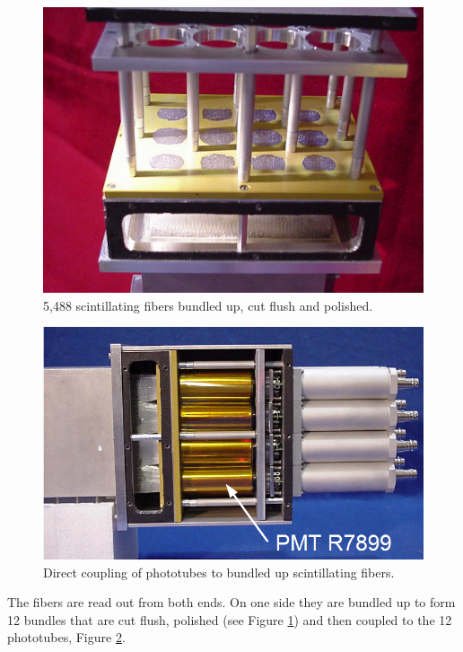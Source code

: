 \begin{figure}[h]
\centering
\includegraphics[width=0.9\linewidth]{images/Fig6a_FiberBundle.jpg} 
    \caption{5,488 scintillating fibers bundled up, cut flush and polished.} 
    \label{fig:FiberBundle}
\end{figure}

\begin{figure}[h]
\centering
\includegraphics[width=0.9\linewidth]{images/Fig6b_DirectCouplePhototube_Text.png} 
    \caption{Direct coupling of phototubes to bundled up scintillating fibers.} 
    \label{fig:DirectCouplePhototube}
\end{figure}

The fibers are read out from both ends. On one side they are bundled up to form 12 bundles that are cut flush, polished (see Figure \ref{fig:FiberBundle}) and then coupled to the 12 phototubes, Figure \ref{fig:DirectCouplePhototube}.

